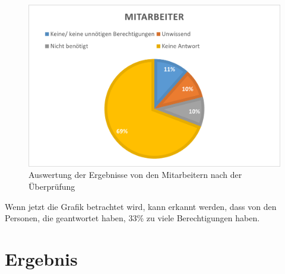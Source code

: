 \begin{figure}[h!]
 \centering
 \includegraphics[width=1\textwidth]{gfx/Picture/Mitarbeiter(korregiert).PNG}
 \caption{Auswertung der Ergebnisse von den Mitarbeitern nach der Überprüfung}
 \label{fig:MitPruf}
\end{figure}
Wenn jetzt die Grafik betrachtet wird, kann erkannt werden, dass von den Personen, die geantwortet haben, 33\% zu viele Berechtigungen haben.

\section{Ergebnis}
\label{sec:Ergebnis}

